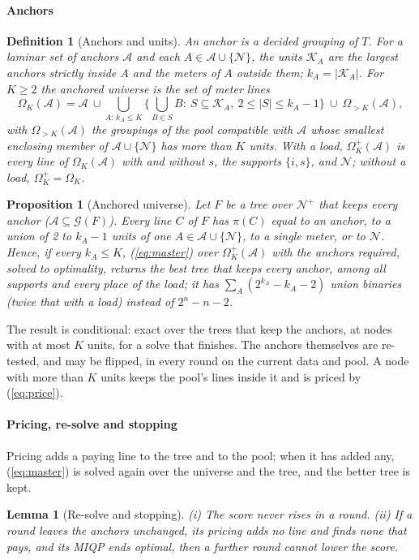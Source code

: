 \documentclass[journal,onecolumn,11pt]{IEEEtran}
\newtheorem{lemma}{Lemma}
\newtheorem{proposition}{Proposition}
\newtheorem{definition}{Definition}
\newcommand{\Nset}{\mathcal{N}}
\newcommand{\Aset}{\mathcal{A}}
\newcommand{\Kset}{\mathcal{K}}
\newcommand{\Gset}{\mathcal{G}}
\begin{document}
\paragraph*{Anchors}
\begin{definition}[Anchors and units]
An \emph{anchor} is a decided grouping of $T$. For a laminar set of anchors $\Aset$ and each $A\in\Aset\cup\{\Nset\}$, the
\emph{units} $\Kset_A$ are the largest anchors strictly inside $A$ and the meters of $A$ outside them; $k_A=|\Kset_A|$. For
$K\ge2$ the \emph{anchored universe} is the set of meter lines
\begin{equation}\label{eq:universe}
\Omega_K(\Aset)=\Aset\ \cup\bigcup_{A:\,k_A\le K}\Big\{\textstyle\bigcup_{B\in S}B:\ S\subseteq\Kset_A,\ 2\le|S|\le k_A-1\Big\}
\ \cup\ \Omega_{>K}(\Aset),
\end{equation}
with $\Omega_{>K}(\Aset)$ the groupings of the pool compatible with $\Aset$ whose smallest enclosing member of
$\Aset\cup\{\Nset\}$ has more than $K$ units. With a load, $\Omega^+_K(\Aset)$ is every line of $\Omega_K(\Aset)$ with and
without $s$, the supports $\{i,s\}$, and $\Nset$; without a load, $\Omega^+_K=\Omega_K$.
\end{definition}
\begin{proposition}[Anchored universe]\label{prop:anchor}
Let $F$ be a tree over $\Nset^+$ that keeps every anchor ($\Aset\subseteq\Gset(F)$). Every line $C$ of $F$ has $\pi(C)$ equal
to an anchor, to a union of 2 to $k_A-1$ units of one $A\in\Aset\cup\{\Nset\}$, to a single meter, or to $\Nset$. Hence, if
every $k_A\le K$, (\ref{eq:master}) over $\Omega^+_K(\Aset)$ with the anchors required, solved to optimality, returns the
best tree that keeps every anchor, among all supports and every place of the load; it has $\sum_A(2^{k_A}-k_A-2)$ union
binaries (twice that with a load) instead of $2^n-n-2$.
\end{proposition}
The result is conditional: exact over the trees that keep the anchors, at nodes with at most $K$ units, for a solve that
finishes. The anchors themselves are re-tested, and may be flipped, in every round on the current data and pool. A node with
more than $K$ units keeps the pool's lines inside it and is priced by (\ref{eq:price}).

\paragraph*{Pricing, re-solve and stopping} Pricing adds a paying line to the tree and to the pool; when it has added any,
(\ref{eq:master}) is solved again over the universe and the tree, and the better tree is kept.
\begin{lemma}[Re-solve and stopping]\label{lem:stop}
(i) The score never rises in a round. (ii) If a round leaves the anchors unchanged, its pricing adds no line and finds none
that pays, and its MIQP ends optimal, then a further round cannot lower the score.
\end{lemma}
\end{document}
